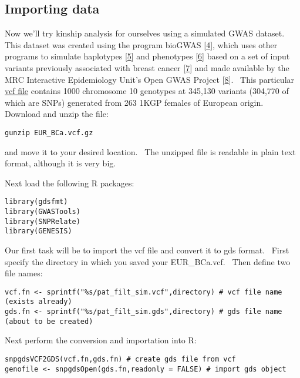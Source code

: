 \documentclass[
]{book}
\begin{document}
\hypertarget{importing-data}{%
\subsection{Importing data}\label{importing-data}}

Now we'll try kinship analysis for ourselves using a simulated GWAS dataset.~ This dataset was created using the program bioGWAS {[}\protect\hyperlink{ref-changalidis_biogwas_2023}{4}{]}, which uses other programs to simulate haplotypes {[}\protect\hyperlink{ref-su_hapgen2_2011}{5}{]} and phenotypes {[}\protect\hyperlink{ref-meyer_phenotypesimulator_2018}{6}{]} based on a set of input variants previously associated with breast cancer {[}\protect\hyperlink{ref-michailidou_genome-wide_2015}{7}{]} and made available by the MRC Interactive Epidemiology Unit's Open GWAS Project {[}\protect\hyperlink{ref-elsworth_mrc_2020}{8}{]}.~ This particular \href{https://github.com/wletsou/BIOL-350/raw/master/docs/EUR_BCa.vcf.gz}{vcf file} contains 1000 chromosome 10 genotypes at 345,130 variants (304,770 of which are SNPs) generated from 263 1KGP females of European origin.~ Download and unzip the file:

\begin{verbatim}
gunzip EUR_BCa.vcf.gz
\end{verbatim}

and move it to your desired location.~ The unzipped file is readable in plain text format, although it is very big.

Next load the following R packages:

\begin{verbatim}
library(gdsfmt)
library(GWASTools)
library(SNPRelate)
library(GENESIS)
\end{verbatim}

Our first task will be to import the vcf file and convert it to gds format.~ First specify the directory in which you saved your EUR\_BCa.vcf.~ Then define two file names:

\begin{verbatim}
vcf.fn <- sprintf("%s/pat_filt_sim.vcf",directory) # vcf file name (exists already)
gds.fn <- sprintf("%s/pat_filt_sim.gds",directory) # gds file name (about to be created)
\end{verbatim}

Next perform the conversion and importation into R:

\begin{verbatim}
snpgdsVCF2GDS(vcf.fn,gds.fn) # create gds file from vcf
genofile <- snpgdsOpen(gds.fn,readonly = FALSE) # import gds object
\end{verbatim}
\end{document}
